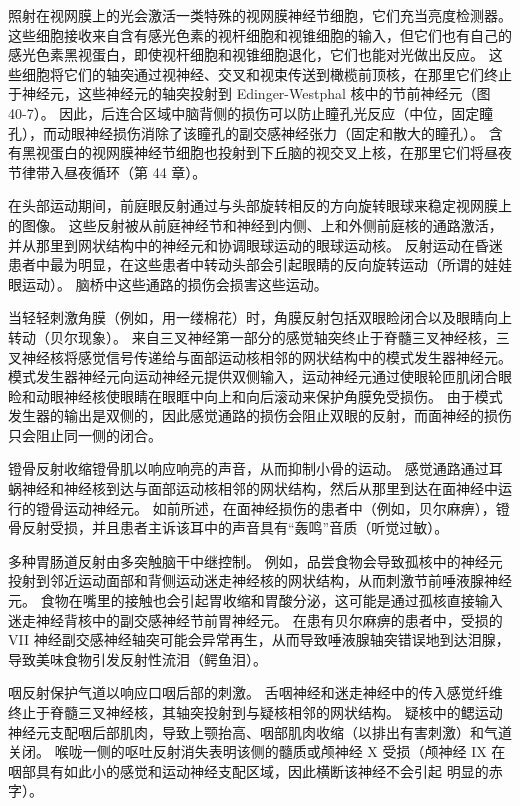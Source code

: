 照射在视网膜上的光会激活一类特殊的视网膜神经节细胞，它们充当亮度检测器。 这些细胞接收来自含有感光色素的视杆细胞和视锥细胞的输入，但它们也有自己的感光色素黑视蛋白，即使视杆细胞和视锥细胞退化，它们也能对光做出反应。 这些细胞将它们的轴突通过视神经、交叉和视束传送到橄榄前顶核，在那里它们终止于神经元，这些神经元的轴突投射到 Edinger-Westphal 核中的节前神经元（图 40-7）。 因此，后连合区域中脑背侧的损伤可以防止瞳孔光反应（中位，固定瞳孔），而动眼神经损伤消除了该瞳孔的副交感神经张力（固定和散大的瞳孔）。 含有黑视蛋白的视网膜神经节细胞也投射到下丘脑的视交叉上核，在那里它们将昼夜节律带入昼夜循环（第 44 章）。

在头部运动期间，前庭眼反射通过与头部旋转相反的方向旋转眼球来稳定视网膜上的图像。 这些反射被从前庭神经节和神经到内侧、上和外侧前庭核的通路激活，并从那里到网状结构中的神经元和协调眼球运动的眼球运动核。 反射运动在昏迷患者中最为明显，在这些患者中转动头部会引起眼睛的反向旋转运动（所谓的娃娃眼运动）。 脑桥中这些通路的损伤会损害这些运动。

当轻轻刺激角膜（例如，用一缕棉花）时，角膜反射包括双眼睑闭合以及眼睛向上转动（贝尔现象）。 来自三叉神经第一部分的感觉轴突终止于脊髓三叉神经核，三叉神经核将感觉信号传递给与面部运动核相邻的网状结构中的模式发生器神经元。 模式发生器神经元向运动神经元提供双侧输入，运动神经元通过使眼轮匝肌闭合眼睑和动眼神经核使眼睛在眼眶中向上和向后滚动来保护角膜免受损伤。 由于模式发生器的输出是双侧的，因此感觉通路的损伤会阻止双眼的反射，而面神经的损伤只会阻止同一侧的闭合。

镫骨反射收缩镫骨肌以响应响亮的声音，从而抑制小骨的运动。 感觉通路通过耳蜗神经和神经核到达与面部运动核相邻的网状结构，然后从那里到达在面神经中运行的镫骨运动神经元。 如前所述，在面神经损伤的患者中（例如，贝尔麻痹），镫骨反射受损，并且患者主诉该耳中的声音具有“轰鸣”音质（听觉过敏）。

多种胃肠道反射由多突触脑干中继控制。 例如，品尝食物会导致孤核中的神经元投射到邻近运动面部和背侧运动迷走神经核的网状结构，从而刺激节前唾液腺神经元。 食物在嘴里的接触也会引起胃收缩和胃酸分泌，这可能是通过孤核直接输入迷走神经背核中的副交感神经节前胃神经元。 在患有贝尔麻痹的患者中，受损的 VII 神经副交感神经轴突可能会异常再生，从而导致唾液腺轴突错误地到达泪腺，导致美味食物引发反射性流泪（鳄鱼泪）。

咽反射保护气道以响应口咽后部的刺激。 舌咽神经和迷走神经中的传入感觉纤维终止于脊髓三叉神经核，其轴突投射到与疑核相邻的网状结构。 疑核中的鳃运动神经元支配咽后部肌肉，导致上颚抬高、咽部肌肉收缩（以排出有害刺激）和气道关闭。 喉咙一侧的呕吐反射消失表明该侧的髓质或颅神经 X 受损（颅神经 IX 在咽部具有如此小的感觉和运动神经支配区域，因此横断该神经不会引起 明显的赤字）。

